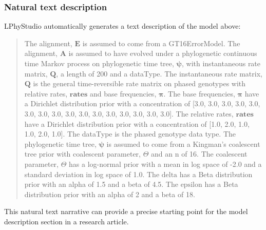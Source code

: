 \documentclass[10pt,letterpaper,table]{article}
\begin{document}
\subsubsection*{Natural text description}
\noindent LPhyStudio automatically generates a text description of the model above:
\begin{quote}
The alignment, $\boldsymbol{E}$ is assumed to come from a GT16ErrorModel.
The alignment, $\boldsymbol{A}$ is assumed to have evolved under a phylogenetic continuous time Markov process \cite{felsenstein1981} on  phylogenetic time tree, $\boldsymbol{\psi}$, with  instantaneous rate matrix, $\boldsymbol{Q}$, a length of 200 and a dataType.
The instantaneous rate matrix, $\boldsymbol{Q}$ is the general time-reversible rate matrix on phased genotypes \cite{kozlov2022cellphy} with relative rates, $\boldsymbol{\textbf{rates}}$ and base frequencies, $\boldsymbol{\pi}$.
The base frequencies, $\boldsymbol{\pi}$ have a Dirichlet distribution prior with a concentration of [3.0, 3.0, 3.0, 3.0, 3.0, 3.0, 3.0, 3.0, 3.0, 3.0, 3.0, 3.0, 3.0, 3.0, 3.0, 3.0].
The relative rates, $\boldsymbol{\textbf{rates}}$ have a Dirichlet distribution prior with a concentration of [1.0, 2.0, 1.0, 1.0, 2.0, 1.0].
The dataType is the phased genotype data type.
The phylogenetic time tree, $\boldsymbol{\psi}$ is assumed to come from a Kingman's coalescent tree prior \cite{kingman82} with  coalescent parameter, $\Theta$ and an n of 16.
The coalescent parameter, $\Theta$ has a log-normal prior with a mean in log space of -2.0 and a standard deviation in log space of 1.0.
The $\textrm{delta}$ has a Beta distribution prior with an alpha of 1.5 and a beta of 4.5.
The $\textrm{epsilon}$ has a Beta distribution prior with an alpha of 2 and a beta of 18.
\end{quote}

This natural text narrative can provide a precise starting point for the model description section in a research article.
\end{document}

